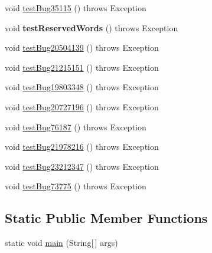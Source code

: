 \begin{DoxyCompactItemize}
\item 
void \mbox{\hyperlink{classtestsuite_1_1regression_1_1_meta_data_regression_test_a73c2bf687084e2bc8c33f56cce84bdbf}{test\+Bug35115}} ()  throws Exception 
\item 
\mbox{\label{classtestsuite_1_1regression_1_1_meta_data_regression_test_af85d61fc6d842052ba712ccdda0fd77a}} 
void {\bfseries test\+Reserved\+Words} ()  throws Exception 
\item 
void \mbox{\hyperlink{classtestsuite_1_1regression_1_1_meta_data_regression_test_ae79b95fa80f4d41af56448aa53d865bb}{test\+Bug20504139}} ()  throws Exception 
\item 
void \mbox{\hyperlink{classtestsuite_1_1regression_1_1_meta_data_regression_test_ae3ea7a46828ed0725464d309295a2663}{test\+Bug21215151}} ()  throws Exception 
\item 
void \mbox{\hyperlink{classtestsuite_1_1regression_1_1_meta_data_regression_test_ae07cbe1ade492b69942cdbb52c4ef65a}{test\+Bug19803348}} ()  throws Exception 
\item 
void \mbox{\hyperlink{classtestsuite_1_1regression_1_1_meta_data_regression_test_a4c0d9aaa7ffb0619d60cd9801b2afcba}{test\+Bug20727196}} ()  throws Exception 
\item 
void \mbox{\hyperlink{classtestsuite_1_1regression_1_1_meta_data_regression_test_a59b663373c79eec136ca0c2473dac25c}{test\+Bug76187}} ()  throws Exception 
\item 
void \mbox{\hyperlink{classtestsuite_1_1regression_1_1_meta_data_regression_test_a375e1a8c67204d8fcbbca1bd9957881d}{test\+Bug21978216}} ()  throws Exception 
\item 
void \mbox{\hyperlink{classtestsuite_1_1regression_1_1_meta_data_regression_test_ab3ee32d4d432ff0acdba1990e9dde9ba}{test\+Bug23212347}} ()  throws Exception 
\item 
void \mbox{\hyperlink{classtestsuite_1_1regression_1_1_meta_data_regression_test_ab626be438fcdf7bbb6d528f00a7dda1d}{test\+Bug73775}} ()  throws Exception 
\end{DoxyCompactItemize}
\subsection*{Static Public Member Functions}
\begin{DoxyCompactItemize}
\item 
static void \mbox{\hyperlink{classtestsuite_1_1regression_1_1_meta_data_regression_test_a2bc970731305062a2b670cd771ed1287}{main}} (String\mbox{[}$\,$\mbox{]} args)
\end{DoxyCompactItemize}
